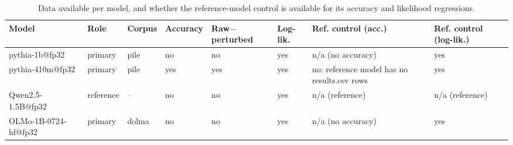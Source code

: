 \begin{table}[t]
\centering
\caption{Data available per model, and whether the reference-model control is available for its accuracy and likelihood regressions.}
\label{tab:data_availability}
\begin{tabular}{llllllll}
\toprule
Model & Role & Corpus & Accuracy & Raw$-$perturbed & Log-lik. & Ref. control (acc.) & Ref. control (log-lik.) \\
\midrule
pythia-1b@fp32 & primary & pile & no & no & yes & n/a (no accuracy) & yes \\
pythia-410m@fp32 & primary & pile & yes & yes & yes & no: reference model has no results.csv rows & yes \\
Qwen2.5-1.5B@fp32 & reference & -- & no & no & yes & n/a (reference) & n/a (reference) \\
OLMo-1B-0724-hf@fp32 & primary & dolma & no & no & yes & n/a (no accuracy) & yes \\
\bottomrule
\end{tabular}
\end{table}
